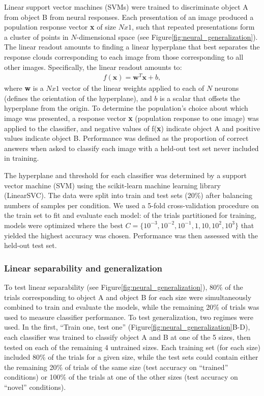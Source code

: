 Linear support vector machines (SVMs) were trained to discriminate object A from object B from neural responses. Each presentation of an image produced a population response vector \textbf{x} of size $Nx1$, such that repeated presentations form a cluster of points in $N$-dimensional space (see Figure\ref{fig:neural_generalization}). The linear readout amounts to finding a linear hyperplane that best separates the response clouds corresponding to each image from those corresponding to all other images. Specifically, the linear readout amounts to\cite{Rust2010SelectivityIT, Hung2005, Li2009}: 
\begin{align}
    f(\textbf{x})=\textbf{w}^T\textbf{x} + b, 
\end{align}
where \textbf{w} is a $Nx1$ vector of the linear weights applied to each of $N$ neurons (defines the orientation of the hyperplane), and $b$ is a scalar that offsets the hyperplane from the origin. To determine the population’s choice about which image was presented, a response vector \textbf{x} (population response to one image) was applied to the classifier, and negative values of f(\textbf{x}) indicate object A and positive values indicate object B. Performance was defined as the proportion of correct answers when asked to classify each image with a held-out test set never included in training. 

The hyperplane and threshold for each classifier was determined by a support vector machine (SVM) using the scikit-learn machine learning library (LinearSVC\cite{Pedregosa2011}). The data were split into train and test sets (20\%) after balancing numbers of samples per condition. We used a 5-fold cross-validation procedure on the train set to fit and evaluate each model:  of the trials partitioned for training, models were optimized where the best $C=\{10^{-3}, 10^{-2}, 10^{-1}, 1, 10, 10^2, 10^3\}$ that yielded the highest accuracy was chosen. Performance was then assessed with the held-out test set. 

\subsubsection{Linear separability and generalization}
To test linear separability (see Figure\ref{fig:neural_generalization}), 80\% of the trials corresponding to object A and object B for each size were simultaneously combined to train and evaluate the models, while the remaining 20\% of trials was used to measure classifier performance. To test generalization, two regimes were used. In the first, ``Train one, test one'' (Figure\ref{fig:neural_generalization}B-D), each classifier was trained to classify object A and B at one of the 5 sizes, then tested on each of the remaining 4 untrained sizes. Each training set (for each size) included 80\% of the trials for a given size, while the test sets could contain either the remaining 20\% of trials of the same size (test accuracy on ``trained'' conditions) or 100\% of the trials at one of the other sizes (test accuracy on ``novel'' conditions). 

